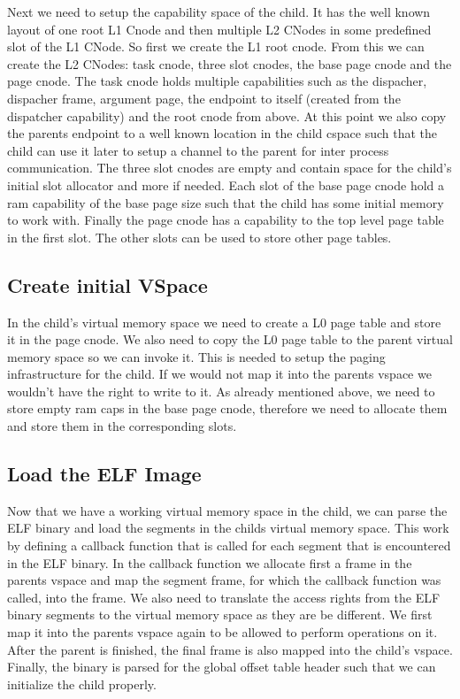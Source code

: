 Next we need to setup the capability space of
the child. It has the well known layout of one root L1 Cnode and then multiple
L2 CNodes in some predefined slot of the L1 CNode.  So first we create the L1
root cnode. From this we can create the L2 CNodes: task cnode, three slot
cnodes, the base page cnode and the page cnode.  The task cnode holds multiple
capabilities such as the dispacher, dispacher frame, argument page, the endpoint
to itself (created from the dispatcher capability) and the root cnode from
above.  At this point we also copy the parents endpoint to a well known location
in the child cspace such that the child can use it later to setup a channel to
the parent for inter process communication.  The three slot cnodes are empty and
contain space for the child's initial slot allocator and more if needed.  Each
slot of the base page cnode hold a ram capability of the base page size such
that the child has some initial memory to work with.  Finally the page cnode has a capability to the top level page table in the first slot. The other slots can
be used to store other page tables.

\subsection{Create initial VSpace} 

In the child's virtual memory space we need to create a L0 page table and store it in the page cnode. We also need to copy the L0 page table to the parent virtual memory space so we can invoke it. This is needed to setup the paging infrastructure for the child. If we would not map it into the parents vspace we wouldn't have the right to write to it.  As already mentioned above, we need to store empty ram caps in the base page cnode, therefore we need to allocate them and store them in the corresponding slots.

\subsection{Load the ELF Image} 
Now that we have a working virtual memory space
in the child, we can parse the ELF binary and load the segments in the childs
virtual memory space. This work by defining a callback function that is called
for each segment that is encountered in the ELF binary.  In the callback
function we allocate first a frame in the parents vspace and map the segment
frame, for which the callback function was called, into the frame. We also need to
translate the access rights from the ELF binary segments to the virtual memory
space as they are be different. We first map it into the parents vspace again to
be allowed to perform operations on it. After the parent is finished, the final
frame is also mapped into the child's vspace.  Finally, the binary is parsed for
the global offset table header such that we can initialize the child properly.

